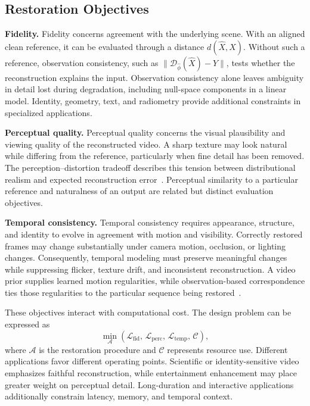 \subsection{Restoration Objectives}
\textbf{Fidelity.} Fidelity concerns agreement with the underlying scene. With an aligned clean reference, it can be evaluated through a distance $d(\widehat X,X)$. Without such a reference, observation consistency, such as $\|\mathcal D_{\widehat\phi}(\widehat X)-Y\|$, tests whether the reconstruction explains the input. Observation consistency alone leaves ambiguity in detail lost during degradation, including null-space components in a linear model. Identity, geometry, text, and radiometry provide additional constraints in specialized applications.

\textbf{Perceptual quality.} Perceptual quality concerns the visual plausibility and viewing quality of the reconstructed video. A sharp texture may look natural while differing from the reference, particularly when fine detail has been removed. The perception--distortion tradeoff describes this tension between distributional realism and expected reconstruction error~\cite{perception_distortion}. Perceptual similarity to a particular reference and naturalness of an output are related but distinct evaluation objectives.

\textbf{Temporal consistency.} Temporal consistency requires appearance, structure, and identity to evolve in agreement with motion and visibility. Correctly restored frames may change substantially under camera motion, occlusion, or lighting changes. Consequently, temporal modeling must preserve meaningful changes while suppressing flicker, texture drift, and inconsistent reconstruction. A video prior supplies learned motion regularities, while observation-based correspondence ties those regularities to the particular sequence being restored~\cite{svd,upscale,stablevsr}.

These objectives interact with computational cost. The design problem can be expressed as
\begin{equation}
\min_{\mathcal A}\left(
\mathcal L_{\mathrm{fid}},\,
\mathcal L_{\mathrm{perc}},\,
\mathcal L_{\mathrm{temp}},\,
\mathcal C\right),
\label{eq:objectives}
\end{equation}
where $\mathcal A$ is the restoration procedure and $\mathcal C$ represents resource use. Different applications favor different operating points. Scientific or identity-sensitive video emphasizes faithful reconstruction, while entertainment enhancement may place greater weight on perceptual detail. Long-duration and interactive applications additionally constrain latency, memory, and temporal context.

